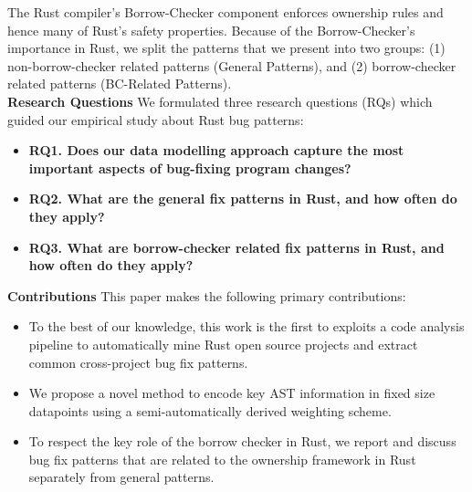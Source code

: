The Rust compiler's Borrow-Checker component enforces ownership rules and hence many of Rust's safety properties. Because of the Borrow-Checker's importance in Rust, we split the patterns that we present into two groups: (1) non-borrow-checker related patterns (General Patterns), and (2) borrow-checker related patterns (BC-Related Patterns). \\

\noindent \textbf{Research Questions} We formulated three research questions (RQs) which guided our empirical study about Rust bug patterns:

\begin{itemize}
    \item \textbf{RQ1. Does our data modelling approach capture the most important aspects of bug-fixing program changes?} 
    \item \textbf{RQ2. What are the general fix patterns in Rust, and how often do they apply?} 
    \item \textbf{RQ3. What are borrow-checker related fix patterns in Rust, and how often do they apply?}
\end{itemize}

\noindent \textbf{Contributions} This paper makes the following primary contributions:

\begin{itemize}
    \item To the best of our knowledge, this work is the first to exploits a code analysis pipeline to automatically mine Rust open source projects and extract common cross-project bug fix patterns.
    \item We propose a novel method to encode key AST information in fixed size datapoints using a semi-automatically derived weighting scheme.
    \item To respect the key role of the borrow checker in Rust, we report and discuss bug fix patterns that are related to the ownership framework in Rust separately from general patterns.
\end{itemize}



